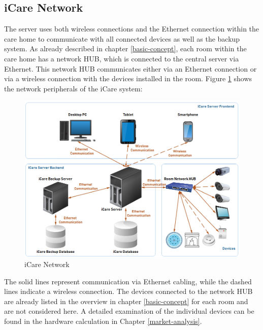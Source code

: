 \subsection{iCare Network}
The server uses both wireless connections and the Ethernet connection within the care home to communicate with all connected devices as well as the backup system. As already described in chapter \ref{basic-concept}, each room within the care home has a network HUB, which is connected to the central server via Ethernet. This network HUB communicates either via an Ethernet connection or via a wireless connection with the devices installed in the room. Figure \ref{icare-network} shows the network peripherals of the iCare system:
\begin{figure}[H]
	\centering
	\includegraphics[width =1.0\textwidth]{images/iCare-Network.PNG}
	\caption{iCare Network}
	\label{icare-network}
\end{figure}
The solid lines represent communication via Ethernet cabling, while the dashed lines indicate a wireless connection. The devices connected to the network HUB are already listed in the overview in chapter \ref{basic-concept} for each room and are not considered here. A detailed examination of the individual devices can be found in the hardware calculation in Chapter \ref{market-analysis}.

